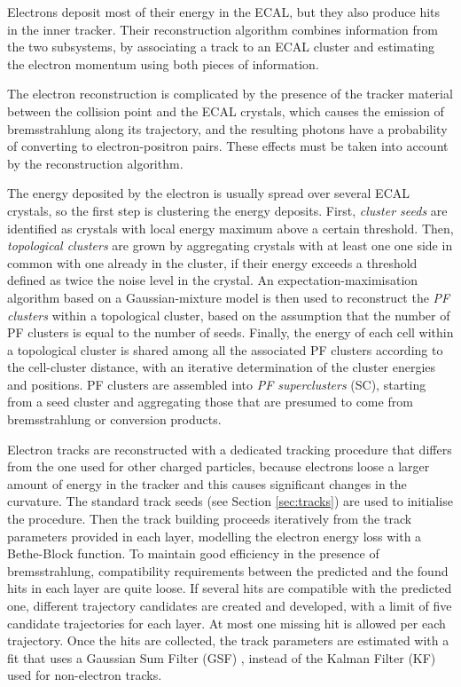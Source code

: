 Electrons deposit most of their energy in the ECAL, but they also produce hits in the inner tracker.
Their reconstruction algorithm combines information from the two subsystems,
by associating a track to an ECAL cluster and estimating the electron momentum using both pieces of information.

The electron reconstruction is complicated by the presence of the tracker material between the collision point and the ECAL crystals,
which causes the emission of bremsstrahlung along its trajectory, and the resulting photons have a probability of converting to electron-positron pairs.
These effects must be taken into account by the reconstruction algorithm.

The energy deposited by the electron is usually spread over several ECAL crystals, so the first step is clustering the energy deposits.
First, \textit{cluster seeds} are identified as crystals with local energy maximum above a certain threshold.
Then, \textit{topological clusters} are grown by aggregating crystals with at least one one side in common with one already in the cluster,
if their energy exceeds a threshold defined as twice the noise level in the crystal.
An expectation-maximisation algorithm based on a Gaussian-mixture model is then used to reconstruct the \textit{PF clusters} within a topological cluster,
based on the assumption that the number of PF clusters is equal to the number of seeds.
Finally, the energy of each cell within a topological cluster is shared among all the associated PF clusters according to the cell-cluster distance,
with an iterative determination of the cluster energies and positions.
PF clusters are assembled into \textit{PF superclusters} (SC), starting from a seed cluster and aggregating those that are presumed to come from bremsstrahlung or conversion products.

Electron tracks are reconstructed with a dedicated tracking procedure that differs from the one used for other charged particles,
because electrons loose a larger amount of energy in the tracker and this causes significant changes in the curvature.
The standard track seeds (see Section \ref{sec:tracks}) are used to initialise the procedure.
Then the track building proceeds iteratively from the track parameters provided in each layer, modelling the electron energy loss with a Bethe-Block function.
To maintain good efficiency in the presence of bremsstrahlung, compatibility requirements between the predicted and the found hits in each layer are quite loose.
If several hits are compatible with the predicted one, different trajectory candidates are created and developed,
with a limit of five candidate trajectories for each layer.
At most one missing hit is allowed per each trajectory.
Once the hits are collected, the track parameters are estimated with a fit that uses a Gaussian Sum Filter (GSF) \cite{CMS-NOTE-2005-001},
instead of the Kalman Filter (KF) \cite{billoir.qian:simultaneous} used for non-electron tracks.

